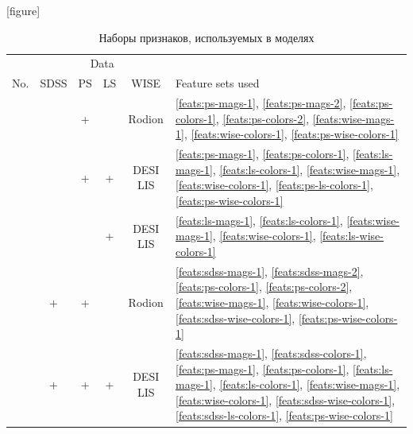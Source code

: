 \documentclass[fleqn,usenatbib]{mnras}
\begin{document}
\begin{table}
    \caption{Наборы признаков, используемых в моделях}
    \label{tab:models}
    \centering
    [figure] 
    \renewcommand{\theModelNumber}{\arabic{ModelNumber}}
    \setcounter{ModelNumber}{0}
    \begin{tabular}{r c c c c l}
    \hline
        {}                      & \multicolumn{4}{c}{Data} & {}\\
        No. & SDSS & PS & LS & WISE & Feature sets used \\
    \hline
        {ModelNumber}\theModelNumber\label{model:pw} & & + & & Rodion & \ref{feats:ps-mags-1}, \ref{feats:ps-mags-2}, \ref{feats:ps-colors-1}, \ref{feats:ps-colors-2}, \ref{feats:wise-mags-1}, \ref{feats:wise-colors-1}, \ref{feats:ps-wise-colors-1} \\ %
        {ModelNumber}\theModelNumber\label{model:pdw} & & + & + & DESI LIS & \ref{feats:ps-mags-1}, \ref{feats:ps-colors-1}, \ref{feats:ls-mags-1}, \ref{feats:ls-colors-1}, \ref{feats:wise-mags-1}, \ref{feats:wise-colors-1}, \ref{feats:ps-ls-colors-1}, \ref{feats:ps-wise-colors-1} \\ %
        {ModelNumber}\theModelNumber\label{model:dw} & & & + & DESI LIS & \ref{feats:ls-mags-1}, \ref{feats:ls-colors-1}, \ref{feats:wise-mags-1}, \ref{feats:wise-colors-1}, \ref{feats:ls-wise-colors-1} \\ %
        {ModelNumber}\theModelNumber\label{model:spw} & + & + & & Rodion & \ref{feats:sdss-mags-1}, \ref{feats:sdss-mags-2}, \ref{feats:ps-colors-1}, \ref{feats:ps-colors-2}, \ref{feats:wise-mags-1}, \ref{feats:wise-colors-1}, \ref{feats:sdss-wise-colors-1}, \ref{feats:ps-wise-colors-1} \\
        {ModelNumber}\theModelNumber\label{model:spdw} & + & + & + & DESI LIS & \ref{feats:sdss-mags-1}, \ref{feats:sdss-colors-1}, \ref{feats:ps-mags-1}, \ref{feats:ps-colors-1}, \ref{feats:ls-mags-1}, \ref{feats:ls-colors-1}, \ref{feats:wise-mags-1}, \ref{feats:wise-colors-1}, \ref{feats:sdss-wise-colors-1}, \ref{feats:sdss-ls-colors-1}, \ref{feats:ps-wise-colors-1} \\ %
    \hline
    \end{tabular}
\end{table}
\end{document}
